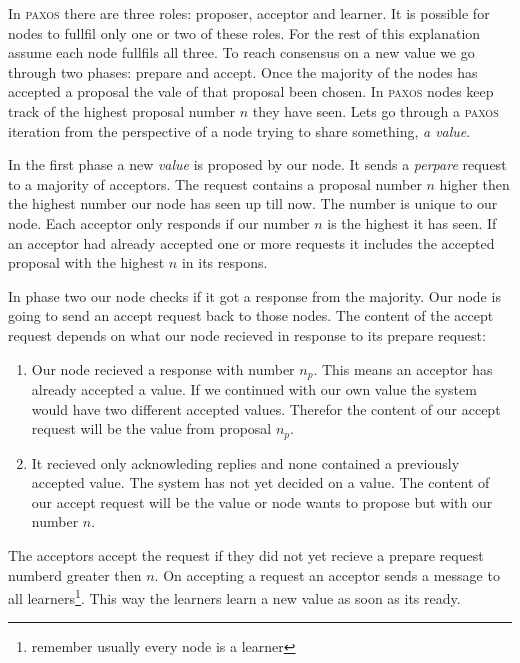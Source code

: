 In \textsc{paxos} there are three roles: proposer, acceptor and learner. It is possible for nodes to fullfil only one or two of these roles. For the rest of this explanation assume each node fullfils all three. To reach consensus on a new value we go through two phases: prepare and accept. Once the majority of the nodes has accepted a proposal the vale of that proposal been chosen. In \textsc{paxos} nodes keep track of the highest proposal number $n$ they have seen. Lets go through a \textsc{paxos} iteration from the perspective of a node trying to share something, \textit{a value}.

In the first phase a new \textit{value} is proposed by our node. It sends a \textit{perpare} request to a majority of acceptors. The request contains a proposal number $n$ higher then the highest number our node has seen up till now. The number is unique to our node. Each acceptor only responds if our number $n$ is the highest it has seen. If an acceptor had already accepted one or more requests it includes the accepted proposal with the highest $n$ in its respons.

In phase two our node checks if it got a response from the majority. Our node is going to send an accept request back to those nodes. The content of the accept request depends on what our node recieved in response to its prepare request:
%
\begin{enumerate}
	\item Our node recieved a response with number $n_p$. This means an acceptor has already accepted a value. If we continued with our own value the system would have two different accepted values. Therefor the content of our accept request will be the value from proposal $n_p$.
	\item It recieved only acknowleding replies and none contained a previously accepted value. The system has not yet decided on a value. The content of our accept request will be the value or node wants to propose but with our number $n$.
\end{enumerate}
%
The acceptors accept the request if they did not yet recieve a prepare request numberd greater then $n$. On accepting a request an acceptor sends a message to all learners\footnote{remember usually every node is a learner}. This way the learners learn a new value as soon as its ready.


